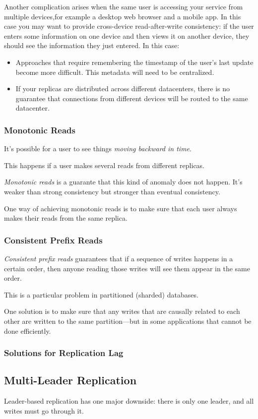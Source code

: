 \documentclass[11pt]{article}
\begin{document}
Another complication arises when the same user is accessing your service from multiple
devices,for example a desktop web browser and a mobile app. In this case you may want to provide
cross-device read-after-write consistency: if the user enters some information on one device and
then views it on another device, they should see the information they just entered. In this
case:
\begin{itemize}
\item Approaches that require remembering the timestamp of the user’s last update become more
difficult. This metadata will need to be centralized.
\item If your replicas are distributed across different datacenters, there is no guarantee that
connections from different devices will be routed to the same datacenter.
\end{itemize}
\subsubsection{Monotonic Reads}
\label{sec:orgaadf2f8}
It's possible for a user to see things \emph{moving backward in time}.

This happens if a user makes several reads from different replicas.

\emph{Monotonic reads} is a guarante that this kind of anomaly does not happen. It's weaker than strong
consistency but stronger than eventual consistency.

One way of achieving monotonic reads is to make sure that each user always makes their reads
from the same replica.
\subsubsection{Consistent Prefix Reads}
\label{sec:org8907b75}
\emph{Consistent prefix reads} guarantees that if a sequence of writes happens in a certain order, then
anyone reading those writes will see them appear in the same order.

This is a particular problem in partitioned (sharded) databases.

One solution is to make sure that any writes that are causally related to each other are written
to the same partition—but in some applications that cannot be done efficiently.
\subsubsection{Solutions for Replication Lag}
\label{sec:org5c043f8}
\subsection{Multi-Leader Replication}
\label{sec:org756011a}
Leader-based replication has one major downside: there is only one leader, and all writes must
go through it.
\end{document}
